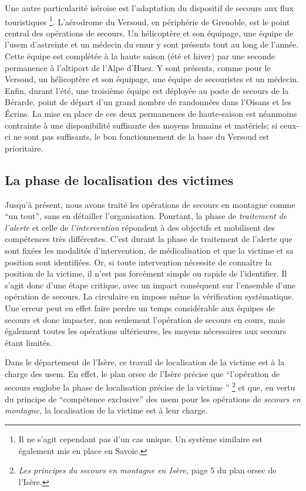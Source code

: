 Une autre particularité iséroise est l'adaptation du dispositif de
secours aux flux touristiques \footnote{Il ne s'agit cependant pas
  d'un cas unique. Un système similaire est également mis en place en
  Savoie.}. L'aérodrome du Versoud, en périphérie de Grenoble, est le
point central des opérations de secours. Un hélicoptère et son
équipage, une équipe de l'\ac{usem} d'astreinte et un médecin du
\ac{smur} y sont présents tout au long de l'année. Cette équipe est
complétée à la haute saison (été et hiver) par une seconde permanence
à l'altiport de l'Alpe d'Huez. Y sont présents, comme pour le Versoud,
un hélicoptère et son équipage, une équipe de secouristes et un
médecin. Enfin, durant l'été, une troisième équipe est déployée au
poste de secours de la Bérarde, point de départ d'un grand nombre de
randonnées dans l'Oisans et les Écrins. La mise en place de ces deux
permanences de haute-saison est néanmoins contrainte à une
disponibilité suffisante des moyens humains et matériels; si ceux-ci
ne sont pas suffisants, le bon fonctionnement de la base du Versoud
est prioritaire.

\subsection{La phase de localisation des victimes}
\label{susec:1-1-2}

Jusqu'à présent, nous avons traité les opérations de secours en
montagne comme \enquote{un tout}, sans en détailler l'organisation.
Pourtant, la phase de \emph{traitement de l'alerte} et celle de
\emph{l'intervention} répondent à des objectifs et mobilisent des
compétences très différentes. C'est durant la phase de traitement de
l'alerte que sont fixées les modalités d'intervention, de
médicalisation et que la victime et sa position sont identifiées. Or,
si toute intervention nécessite de connaître la position de la
victime, il n'est pas forcément simple ou rapide de l'identifier. Il
s'agit donc d'une étape critique, avec un impact conséquent sur
l'ensemble d'une opération de secours. La circulaire  en
impose même la vérification systématique. Une erreur peut en effet
faire perdre un temps considérable aux équipes de secours et donc
impacter, non seulement l'opération de secours en cours, mais
également toutes les opérations ultérieures, les moyens nécessaires
aux secours étant limités.

Dans le département de l'Isère, ce travail de localisation de la
victime est à la charge des \ac{usem}. En effet, le plan \ac{orsec} de
l'Isère précise que \enquote{l’opération de secours \textelp{} englobe
  la phase de localisation précise de la victime \textelp{}}
\footnote{\emph{Les principes du secours en montagne en Isère,} page 5
  du plan \ac{orsec} de l'Isère.} et que, en vertu du principe de
\enquote{compétence exclusive} des \ac{usem} pour les opérations de
\emph{secours en montagne,} la localisation de la victime est à leur
charge.

